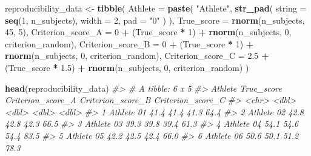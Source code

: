 \documentclass[
]{book}
\newenvironment{Shaded}{\begin{snugshade}}{\end{snugshade}}
\newcommand{\CommentTok}[1]{\textcolor[rgb]{0.56,0.35,0.01}{\textit{#1}}}
\newcommand{\DataTypeTok}[1]{\textcolor[rgb]{0.13,0.29,0.53}{#1}}
\newcommand{\DecValTok}[1]{\textcolor[rgb]{0.00,0.00,0.81}{#1}}
\newcommand{\FloatTok}[1]{\textcolor[rgb]{0.00,0.00,0.81}{#1}}
\newcommand{\KeywordTok}[1]{\textcolor[rgb]{0.13,0.29,0.53}{\textbf{#1}}}
\newcommand{\NormalTok}[1]{#1}
\newcommand{\OperatorTok}[1]{\textcolor[rgb]{0.81,0.36,0.00}{\textbf{#1}}}
\newcommand{\StringTok}[1]{\textcolor[rgb]{0.31,0.60,0.02}{#1}}
\begin{document}
\begin{Shaded}
\begin{Highlighting}[]
\NormalTok{reproducibility\_data <{-}}\StringTok{ }\KeywordTok{tibble}\NormalTok{(}
  \DataTypeTok{Athlete =} \KeywordTok{paste}\NormalTok{(}
    \StringTok{"Athlete"}\NormalTok{,}
    \KeywordTok{str\_pad}\NormalTok{(}
      \DataTypeTok{string =} \KeywordTok{seq}\NormalTok{(}\DecValTok{1}\NormalTok{, n\_subjects),}
      \DataTypeTok{width =} \DecValTok{2}\NormalTok{,}
      \DataTypeTok{pad =} \StringTok{"0"}
\NormalTok{    )}
\NormalTok{  ),}
  \DataTypeTok{True\_score =} \KeywordTok{rnorm}\NormalTok{(n\_subjects, }\DecValTok{45}\NormalTok{, }\DecValTok{5}\NormalTok{),}
  \DataTypeTok{Criterion\_score\_A =} \DecValTok{0} \OperatorTok{+}\StringTok{ }\NormalTok{(True\_score }\OperatorTok{*}\StringTok{ }\DecValTok{1}\NormalTok{) }\OperatorTok{+}\StringTok{ }\KeywordTok{rnorm}\NormalTok{(n\_subjects, }\DecValTok{0}\NormalTok{, criterion\_random),}
  \DataTypeTok{Criterion\_score\_B =} \DecValTok{0} \OperatorTok{+}\StringTok{ }\NormalTok{(True\_score }\OperatorTok{*}\StringTok{ }\DecValTok{1}\NormalTok{) }\OperatorTok{+}\StringTok{ }\KeywordTok{rnorm}\NormalTok{(n\_subjects, }\DecValTok{0}\NormalTok{, criterion\_random),}
  \DataTypeTok{Criterion\_score\_C =} \FloatTok{2.5} \OperatorTok{+}\StringTok{ }\NormalTok{(True\_score }\OperatorTok{*}\StringTok{ }\FloatTok{1.5}\NormalTok{) }\OperatorTok{+}\StringTok{ }\KeywordTok{rnorm}\NormalTok{(n\_subjects, }\DecValTok{0}\NormalTok{, criterion\_random)}
\NormalTok{)}

\KeywordTok{head}\NormalTok{(reproducibility\_data)}
\CommentTok{\#> \# A tibble: 6 x 5}
\CommentTok{\#>   Athlete    True\_score Criterion\_score\_A Criterion\_score\_B Criterion\_score\_C}
\CommentTok{\#>   <chr>           <dbl>             <dbl>             <dbl>             <dbl>}
\CommentTok{\#> 1 Athlete 01       41.4              41.4              41.3              64.4}
\CommentTok{\#> 2 Athlete 02       42.8              42.8              42.3              66.5}
\CommentTok{\#> 3 Athlete 03       39.3              39.8              39.4              61.3}
\CommentTok{\#> 4 Athlete 04       54.1              54.6              54.4              83.5}
\CommentTok{\#> 5 Athlete 05       42.2              42.5              42.4              66.0}
\CommentTok{\#> 6 Athlete 06       50.6              50.1              51.2              78.3}
\end{Highlighting}
\end{Shaded}
\end{document}
